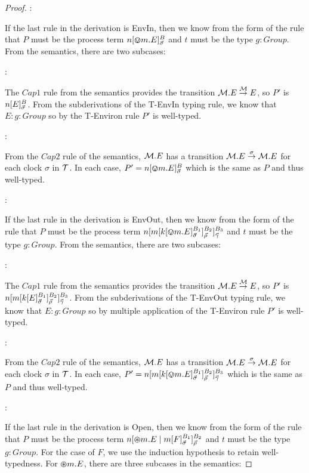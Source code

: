 \begin{proof}
:

\noindent If the last rule in the derivation is EnvIn, then we know
from the form of the rule that $P$ must be the process term
${n}[ \varovee m.E ]^{B}_{\vec{\sigma}}$ and $t$ must be the type $g :
  Group$.  From the semantics, there are two subcases:

:

\noindent The $Cap1$ rule from the semantics provides the transition
$\text{$\mathcal{M}$}.E \stackrel{\text{$\mathcal{M}$}}{\rightarrow} E$, so $P'$ is
${n}[ E ]^{B}_{\vec{\sigma}}$.  From the subderivations of the
T-EnvIn typing rule, we know that $E : g : Group$ so by the T-Environ
rule $P'$ is well-typed.

:

\noindent From the $Cap2$ rule of the semantics, $\text{$\mathcal{M}$}.E$ has a
transition $\text{$\mathcal{M}$}.E \stackrel{\sigma}{\rightarrow} \text{$\mathcal{M}$}.E$ for each clock
$\sigma$ in $\text{$\mathcal{T}$}$.  In each case, $P' =
{n}[ \varovee m.E ]^{B}_{\vec{\sigma}}$ which is the same as $P$ and
thus well-typed.

:

\noindent If the last rule in the derivation is EnvOut, then we know
from the form of the rule that $P$ must be the process term
${n}[ {m}[ {k}[ \varovee m.E ]^{B_1}_{\vec{\sigma}} ]^{B_2}_{\vec{\rho}} ]^{B_3}_{\vec{\gamma}}$
and $t$ must be the type $g : Group$.  From the semantics, there are
two subcases:

:

\noindent The $Cap1$ rule from the semantics provides the transition
$\text{$\mathcal{M}$}.E \stackrel{\text{$\mathcal{M}$}}{\rightarrow} E$, so $P'$ is
${n}[ {m}[ {k}[ E ]^{B_1}_{\vec{\sigma}} ]^{B_2}_{\vec{\rho}} ]^{B_3}_{\vec{\gamma}}$.
From the subderivations of the T-EnvOut typing rule, we know that $E : g
: Group$ so by multiple application of the T-Environ rule $P'$ is
well-typed.

:

\noindent From the $Cap2$ rule of the semantics, $\text{$\mathcal{M}$}.E$ has a
transition $\text{$\mathcal{M}$}.E \stackrel{\sigma}{\rightarrow} \text{$\mathcal{M}$}.E$ for each clock
$\sigma$ in $\text{$\mathcal{T}$}$.  In each case, $P' =
{n}[ {m}[ {k}[ \varovee m.E ]^{B_1}_{\vec{\sigma}} ]^{B_2}_{\vec{\rho}} ]^{B_3}_{\vec{\gamma}}$
which is the same as $P$ and thus well-typed.

:

\noindent If the last rule in the derivation is Open, then we know
from the form of the rule that $P$ must be the process term
${n}[ \varoast m.E \;|\;
  {m}[ F ]^{B_1}_{\vec{\sigma}} ]^{B_2}_{\vec{\rho}}$ and $t$ must be
the type $g : Group$.  For the case of $F$, we use the induction
hypothesis to retain well-typedness.  For $\varoast m.E$, there are
three subcases in the semantics:


\end{proof}
